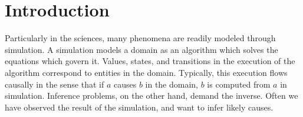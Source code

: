 \section{Introduction}


Particularly in the sciences, many phenomena are readily modeled through simulation.
A simulation models a domain as an algorithm which solves the equations which govern it. Values, states, and transitions in the execution of the algorithm correspond to entities in the domain.
Typically, this execution flows causally in the sense that if $a$ causes $b$ in the domain, $b$ is computed from $a$ in simulation.
Inference problems, on the other hand, demand the inverse.
Often we have observed the result of the simulation, and want to infer likely causes.



